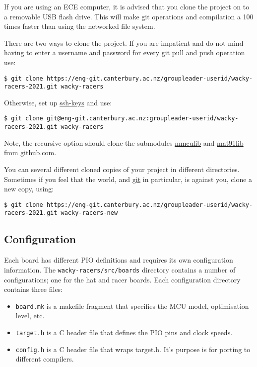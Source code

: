 If you are using an ECE computer, it is advised that you clone the
project on to a removable USB flash drive. This will make git operations
and compilation a 100 times faster than using the networked file system.

There are two ways to clone the project. If you are impatient and do not
mind having to enter a username and password for every git pull and push
operation use:
%
\begin{verbatim}
$ git clone https://eng-git.canterbury.ac.nz/groupleader-userid/wacky-racers-2021.git wacky-racers
\end{verbatim}

Otherwise, set up \url{ssh-keys} and use:
%
\begin{verbatim}
$ git clone git@eng-git.canterbury.ac.nz:groupleader-userid/wacky-racers-2021.git wacky-racers
\end{verbatim}

Note, the recursive option should clone the submodules \url{mmculib} and
\url{mat91lib} from github.com.

You can several different cloned copies of your project in different
directories. Sometimes if you feel that the world, and \url{git} in
particular, is against you, clone a new copy, using:


\begin{verbatim}
$ git clone https://eng-git.canterbury.ac.nz/groupleader-userid/wacky-racers-2021.git wacky-racers-new
\end{verbatim}

\subsection{Configuration}
\label{configuration}

Each board has different PIO definitions and requires its own
configuration information. The \texttt{wacky-racers/src/boards}
directory contains a number of configurations; one for the hat and racer
boards. Each configuration directory contains three files:

\begin{itemize}
\item
  \texttt{board.mk} is a makefile fragment that specifies the MCU model,
  optimisation level, etc.
\item
  \texttt{target.h} is a C header file that defines the PIO pins and
  clock speeds.
\item
  \texttt{config.h} is a C header file that wraps target.h. It's purpose
  is for porting to different compilers.
\end{itemize}

